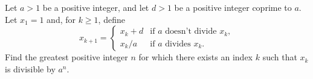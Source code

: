 Let $a > 1$ be a positive integer, and let $d > 1$ be a positive integer coprime to $a$. Let $x_1 = 1$ and, for $k \geq 1$, define
\[ x_{k+1} = \begin{cases} x_k + d & \text{if } a \text{ doesn't divide } x_k, \\ x_k/a & \text{if } a \text{ divides } x_k. \end{cases} \]
Find the greatest positive integer $n$ for which there exists an index $k$ such that $x_k$ is divisible by $a^n$.
